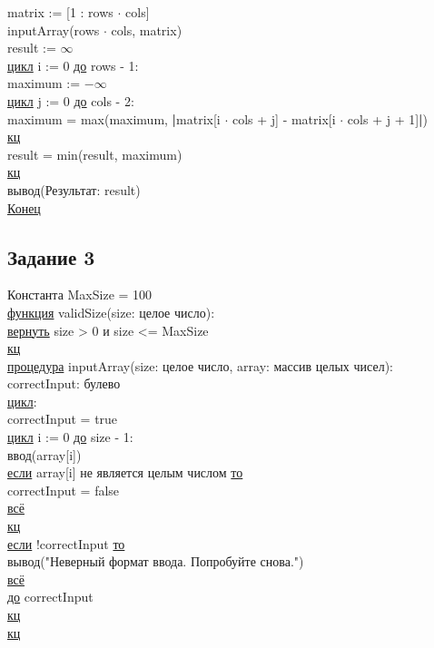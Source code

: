 \noindent
\null\qquad matrix := [1 : rows \(\cdot\)  cols]\\
\null\qquad inputArray(rows \(\cdot\) cols, matrix)\\

\noindent
\null\qquad result := \(\infty\) \\
\null\qquad \underline{цикл} i := 0 \underline{до} rows - 1:\\
\null\qquad \null\qquad maximum := \(-\infty\) \\
\null\qquad \null\qquad \underline{цикл} j := 0 \underline{до} cols - 2:\\
\null\qquad \null\qquad \null\qquad maximum = max(maximum, \textbf{|}matrix[i \(\cdot\) cols + j] - matrix[i \(\cdot\) cols + j + 1]\textbf{|})\\
\null\qquad \null\qquad \underline{кц}\\
\null\qquad \null\qquad result = min(result, maximum)\\
\null\qquad \underline{кц}\\
\null\qquad вывод(Результат: result)\\
\underline{Конец}

\subsection*{Задание 3}

Константа MaxSize = 100\\


\noindent \underline{функция} validSize(size: целое число):\\
\null\qquad \underline{вернуть} size > 0 и size <= MaxSize\\
\underline{кц}\\

\noindent \underline{процедура} inputArray(size: целое число, array: массив целых чисел):\\
\null\qquad correctInput: булево\\
\null\qquad \underline{цикл}:\\
\null\qquad \qquad correctInput = true\\
\null\qquad \qquad \underline{цикл} i := 0 \underline{до} size - 1:\\
\null\qquad \qquad \qquad ввод(array[i])\\
\null\qquad \qquad \qquad \underline{если} array[i] не является целым числом \underline{то}\\
\null\qquad \qquad \qquad \qquad correctInput = false\\
\null\qquad \qquad \qquad \underline{всё}\\
\null\qquad \qquad \underline{кц}\\
\null\qquad \qquad \underline{если} !correctInput \underline{то}\\
\null\qquad \qquad \qquad вывод("Неверный формат ввода. Попробуйте снова.")\\
\null\qquad \qquad \underline{всё}\\
\null\qquad \underline{до} correctInput\\
\null\qquad \underline{кц}\\
\underline{кц}\\


